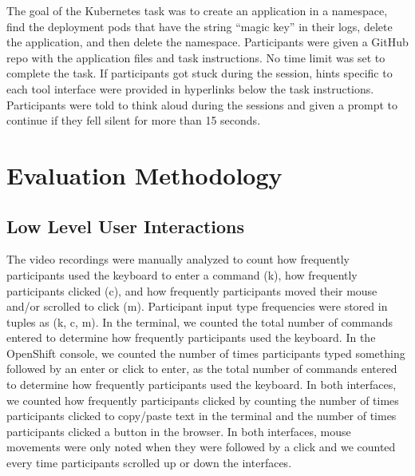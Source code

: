 \documentclass[11pt, oneside]{article}   	%
\begin{document}

The goal of the Kubernetes task was to create an application in a namespace, find the deployment pods that have the string “magic key” in their logs, delete the application, and then delete the namespace. Participants were given a GitHub repo with the application files and task instructions. No time limit was set to complete the task. If participants got stuck during the session, hints specific to each tool interface were provided in hyperlinks below the task instructions. Participants were told to think aloud during the sessions and given a prompt to continue if they fell silent for more than 15 seconds.

\section{Evaluation Methodology}
\subsection{Low Level User Interactions}
The video recordings were manually analyzed to count how frequently participants used the keyboard to enter a command (k), how frequently participants clicked (c), and how frequently participants moved their mouse and/or scrolled to click (m). Participant input type frequencies were stored in tuples as (k, c, m). In the terminal, we counted the total number of commands entered to determine how frequently participants used the keyboard. In the OpenShift console, we counted the number of times participants typed something followed by an enter or click to enter, as the total number of commands entered to determine how frequently participants used the keyboard. In both interfaces, we counted how frequently participants clicked by counting the number of times participants clicked to copy/paste text in the terminal and the number of times participants clicked a button in the browser. In both interfaces, mouse movements were only noted when they were followed by a click and we counted every time participants scrolled up or down the interfaces. 
\end{document}
